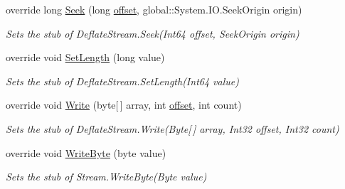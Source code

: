 \begin{DoxyCompactItemize}
override long \hyperlink{class_system_1_1_i_o_1_1_compression_1_1_fakes_1_1_stub_deflate_stream_a322f4830eae5efa1d16e26eb4438fdc3}{Seek} (long \hyperlink{jquery-1_810_82_8js_a4a9f594d20d927164551fc7fa4751a2f}{offset}, global\-::\-System.\-I\-O.\-Seek\-Origin origin)
\begin{DoxyCompactList}\small\item\em Sets the stub of Deflate\-Stream.\-Seek(\-Int64 offset, Seek\-Origin origin)\end{DoxyCompactList}\item 
override void \hyperlink{class_system_1_1_i_o_1_1_compression_1_1_fakes_1_1_stub_deflate_stream_a041f7d5401614be6fec19a3933300260}{Set\-Length} (long value)
\begin{DoxyCompactList}\small\item\em Sets the stub of Deflate\-Stream.\-Set\-Length(\-Int64 value)\end{DoxyCompactList}\item 
override void \hyperlink{class_system_1_1_i_o_1_1_compression_1_1_fakes_1_1_stub_deflate_stream_a86c4e00d22aa69d81a391b7775007404}{Write} (byte\mbox{[}$\,$\mbox{]} array, int \hyperlink{jquery-1_810_82_8js_a4a9f594d20d927164551fc7fa4751a2f}{offset}, int count)
\begin{DoxyCompactList}\small\item\em Sets the stub of Deflate\-Stream.\-Write(\-Byte\mbox{[}$\,$\mbox{]} array, Int32 offset, Int32 count)\end{DoxyCompactList}\item 
override void \hyperlink{class_system_1_1_i_o_1_1_compression_1_1_fakes_1_1_stub_deflate_stream_af2eb7d15a9fe2730e70f6973066b0222}{Write\-Byte} (byte value)
\begin{DoxyCompactList}\small\item\em Sets the stub of Stream.\-Write\-Byte(\-Byte value)\end{DoxyCompactList}\end{DoxyCompactItemize}
